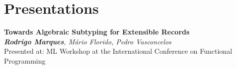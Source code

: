 \documentclass[11pt,a4paper]{moderncv}
\begin{document}
\section{Presentations}

\begin{description}[labelwidth=60pt,align=right,leftmargin=!]
    \item[\normalfont{\emph{ML 2022}}] \textbf{Towards Algebraic Subtyping for Extensible Records}
                                    \\ \emph{\textbf{Rodrigo Marques}, Mário Florido, Pedro Vasconcelos}                                
                                    \\ Presented at: ML Workshop at the International Conference on Functional Programming
\end{description}
\end{document}
